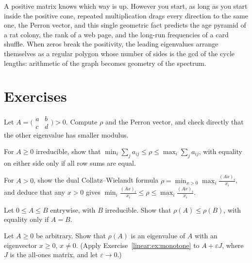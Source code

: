 \begin{beauty}
A positive matrix knows which way is up. However you start, as long as you start inside the positive cone, repeated
multiplication drags every direction to the same one, the Perron vector, and this single geometric fact predicts the age
pyramid of a rat colony, the rank of a web page, and the long-run frequencies of a card shuffle. When zeros break the
positivity, the leading eigenvalues arrange themselves as a regular polygon whose number of sides is the gcd of the cycle
lengths: arithmetic of the graph becomes geometry of the spectrum.
\end{beauty}

\section{Exercises}

\begin{exercise}[$\star$]\label{linear:ex:perron2}
Let $A=\bigl(\begin{smallmatrix}a&b\\c&d\end{smallmatrix}\bigr)>0$. Compute $\rho$ and the Perron vector, and check directly
that the other eigenvalue has smaller modulus.
\end{exercise}

\begin{exercise}[$\star$]\label{linear:ex:rowsum}
For $A\ge0$ irreducible, show that $\min_i\sum_ja_{ij}\le\rho\le\max_i\sum_ja_{ij}$, with equality on either side only if all row
sums are equal.
\end{exercise}

\begin{exercise}[$\star\star$]\label{linear:ex:minmaxcw}
For $A>0$, show the dual Collatz--Wielandt formula $\rho=\min_{x>0}\max_i\frac{(Ax)_i}{x_i}$, and deduce that any $x>0$ gives
$\min_i\frac{(Ax)_i}{x_i}\le\rho\le\max_i\frac{(Ax)_i}{x_i}$.
\end{exercise}

\begin{exercise}[$\star\star$]\label{linear:ex:monotone}
Let $0\le A\le B$ entrywise, with $B$ irreducible. Show that $\rho(A)\le\rho(B)$, with equality only if $A=B$.
\end{exercise}

\begin{exercise}[$\star\star$]\label{linear:ex:nonneg}
Let $A\ge0$ be arbitrary. Show that $\rho(A)$ is an eigenvalue of $A$ with an eigenvector $x\ge0$, $x\ne0$. (Apply
Exercise~\ref{linear:ex:monotone} to $A+\varepsilon J$, where $J$ is the all-ones matrix, and let $\varepsilon\to0$.)
\end{exercise}


